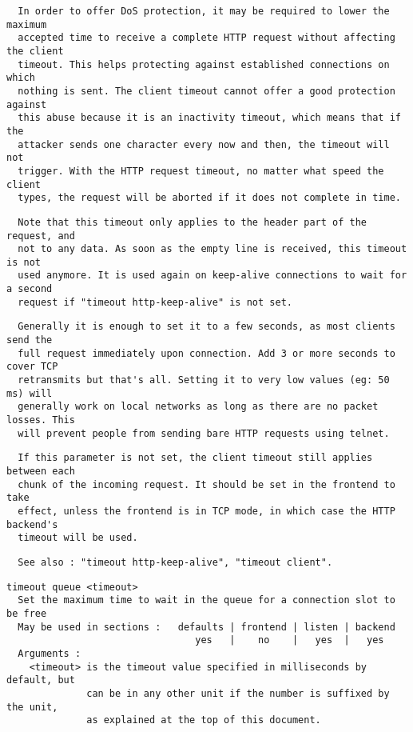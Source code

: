 \begin{verbatim}
  In order to offer DoS protection, it may be required to lower the maximum
  accepted time to receive a complete HTTP request without affecting the client
  timeout. This helps protecting against established connections on which
  nothing is sent. The client timeout cannot offer a good protection against
  this abuse because it is an inactivity timeout, which means that if the
  attacker sends one character every now and then, the timeout will not
  trigger. With the HTTP request timeout, no matter what speed the client
  types, the request will be aborted if it does not complete in time.
\end{verbatim}

\begin{verbatim}
  Note that this timeout only applies to the header part of the request, and
  not to any data. As soon as the empty line is received, this timeout is not
  used anymore. It is used again on keep-alive connections to wait for a second
  request if "timeout http-keep-alive" is not set.
\end{verbatim}

\begin{verbatim}
  Generally it is enough to set it to a few seconds, as most clients send the
  full request immediately upon connection. Add 3 or more seconds to cover TCP
  retransmits but that's all. Setting it to very low values (eg: 50 ms) will
  generally work on local networks as long as there are no packet losses. This
  will prevent people from sending bare HTTP requests using telnet.
\end{verbatim}

\begin{verbatim}
  If this parameter is not set, the client timeout still applies between each
  chunk of the incoming request. It should be set in the frontend to take
  effect, unless the frontend is in TCP mode, in which case the HTTP backend's
  timeout will be used.
\end{verbatim}

\begin{verbatim}
  See also : "timeout http-keep-alive", "timeout client".
\end{verbatim}

\begin{verbatim}
timeout queue <timeout>
  Set the maximum time to wait in the queue for a connection slot to be free
  May be used in sections :   defaults | frontend | listen | backend
                                 yes   |    no    |   yes  |   yes
  Arguments :
    <timeout> is the timeout value specified in milliseconds by default, but
              can be in any other unit if the number is suffixed by the unit,
              as explained at the top of this document.
\end{verbatim}

